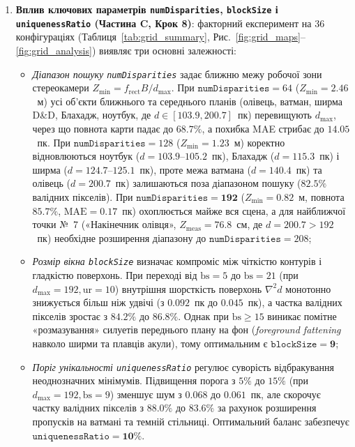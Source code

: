 \documentclass[14pt, a4paper]{extarticle}
\begin{document}
\begin{enumerate}
    \item \textbf{Вплив ключових параметрів \texttt{numDisparities}, \texttt{blockSize} і \texttt{uniquenessRatio} (Частина C, Крок 8)}: факторний експеримент на 36 конфігураціях (Таблиця~\ref{tab:grid_summary}, Рис.~\ref{fig:grid_maps}--\ref{fig:grid_analysis}) виявляє три основні залежності:
    \begin{itemize}
        \item \textit{Діапазон пошуку \texttt{numDisparities}} задає ближню межу робочої зони стереокамери $Z_{\min} = f_{\text{rect}} B / d_{\max}$. При $\texttt{numDisparities} = 64$ ($Z_{\min} = 2.46$~м) усі об'єкти ближнього та середнього планів (олівець, ватман, ширма D\&D, Блахадж, ноутбук, де $d \in [103.9, 200.7]$~пк) перевищують $d_{\max}$, через що повнота карти падає до $68.7\%$, а похибка MAE стрибає до $14.05$~пк. При $\texttt{numDisparities} = 128$ ($Z_{\min} = 1.23$~м) коректно відновлюються ноутбук ($d = 103.9$--$105.2$~пк), Блахадж ($d = 115.3$~пк) і ширма ($d = 124.7$--$125.1$~пк), проте межа ватмана ($d = 140.4$~пк) та олівець ($d = 200.7$~пк) залишаються поза діапазоном пошуку ($82.5\%$ валідних пікселів). При $\mathbf{\texttt{numDisparities} = 192}$ ($Z_{\min} = 0.82$~м, повнота $85.7\%$, $\text{MAE} = 0.17$~пк) охоплюється майже вся сцена, а для найближчої точки №~7 («Накінечник олівця», $Z_{\text{meas}} = 76.8$~см, де $d = 200.7 > 192$~пк) необхідне розширення діапазону до $\texttt{numDisparities} = 208$;
        \item \textit{Розмір вікна \texttt{blockSize}} визначає компроміс між чіткістю контурів і гладкістю поверхонь. При переході від $\text{bs} = 5$ до $\text{bs} = 21$ (при $d_{\max} = 192, \text{ur} = 10$) внутрішня шорсткість поверхонь $\nabla^2 d$ монотонно знижується більш ніж удвічі (з $0.092$~пк до $0.045$~пк), а частка валідних пікселів зростає з $84.2\%$ до $86.8\%$. Однак при $\text{bs} \ge 15$ виникає помітне «розмазування» силуетів переднього плану на фон (\emph{foreground fattening} навколо ширми та плавців акули), тому оптимальним є $\mathbf{\texttt{blockSize} = 9}$;
        \item \textit{Поріг унікальності \texttt{uniquenessRatio}} регулює суворість відбракування неоднозначних мінімумів. Підвищення порога з $5\%$ до $15\%$ (при $d_{\max}=192, \text{bs}=9$) зменшує шум з $0.068$ до $0.061$~пк, але скорочує частку валідних пікселів з $88.0\%$ до $83.6\%$ за рахунок розширення пропусків на ватмані та темній стільниці. Оптимальний баланс забезпечує $\mathbf{\texttt{uniquenessRatio} = 10\%}$.
    \end{itemize}


\end{enumerate}
\end{document}
